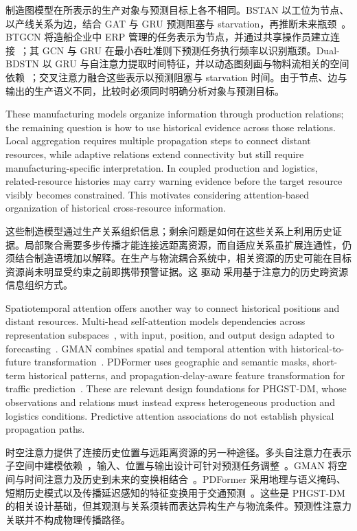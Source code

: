 \documentclass[a4paper,fleqn]{cas-dc}
\newcommand{\zhpara}[1]{%
  \par\begingroup\small\color{black!72}\noindent #1\par\endgroup}
\begin{document}
\zhpara{制造图模型在所表示的生产对象与预测目标上各不相同。BSTAN 以工位为节点、以产线关系为边，结合 GAT 与 GRU 预测阻塞与 starvation，再推断未来瓶颈~\cite{lai2023bstan}。BTGCN 将造船企业中 ERP 管理的任务表示为节点，并通过共享操作员建立连接~\cite{yin2025btgcn}；其 GCN 与 GRU 在最小吞吐准则下预测任务执行频率以识别瓶颈。Dual-BDSTN 以 GRU 与自注意力提取时间特征，并以动态图刻画与物料流相关的空间依赖~\cite{cen2025dstnn}；交叉注意力融合这些表示以预测阻塞与 starvation 时间。由于节点、边与输出的生产语义不同，比较时必须同时明确分析对象与预测目标。}


These manufacturing models organize information through production relations; the remaining question is how to use historical evidence across those relations. Local aggregation requires multiple propagation steps to connect distant resources, while adaptive relations extend connectivity but still require manufacturing-specific interpretation. In coupled production and logistics, related-resource histories may carry warning evidence before the target resource visibly becomes constrained. This motivates considering attention-based organization of historical cross-resource information.

\zhpara{这些制造模型通过生产关系组织信息；剩余问题是如何在这些关系上利用历史证据。局部聚合需要多步传播才能连接远距离资源，而自适应关系虽扩展连通性，仍须结合制造语境加以解释。在生产与物流耦合系统中，相关资源的历史可能在目标资源尚未明显受约束之前即携带预警证据。这 驱动 采用基于注意力的历史跨资源信息组织方式。}


Spatiotemporal attention offers another way to connect historical positions and distant resources. Multi-head self-attention models dependencies across representation subspaces~\cite{vaswani2017attention}, with input, position, and output design adapted to forecasting~\cite{wen2023transformers}. GMAN combines spatial and temporal attention with historical-to-future transformation~\cite{zheng2020gman}. PDFormer uses geographic and semantic masks, short-term historical patterns, and propagation-delay-aware feature transformation for traffic prediction~\cite{jiang2023pdformer}. These are relevant design foundations for PHGST-DM, whose observations and relations must instead express heterogeneous production and logistics conditions. Predictive attention associations do not establish physical propagation paths.

\zhpara{时空注意力提供了连接历史位置与远距离资源的另一种途径。多头自注意力在表示子空间中建模依赖~\cite{vaswani2017attention}，输入、位置与输出设计可针对预测任务调整~\cite{wen2023transformers}。GMAN 将空间与时间注意力及历史到未来的变换相结合~\cite{zheng2020gman}。PDFormer 采用地理与语义掩码、短期历史模式以及传播延迟感知的特征变换用于交通预测~\cite{jiang2023pdformer}。这些是 PHGST-DM 的相关设计基础，但其观测与关系须转而表达异构生产与物流条件。预测性注意力关联并不构成物理传播路径。}
\end{document}
